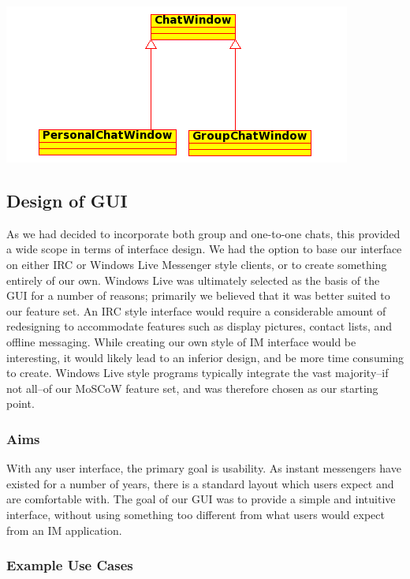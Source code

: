 \includegraphics[scale=0.65]{Design/diagrams/chatwin.png}


\subsection{Design of GUI}
\label{gui_design}

As we had decided to incorporate both group and one-to-one chats, this provided a wide scope in terms of interface design. We had the option to base our interface on either IRC or Windows Live Messenger style clients, or to create something entirely of our own. Windows Live was ultimately selected as the basis of the GUI for a number of reasons; primarily we believed that it was better suited to our feature set. An IRC style interface would require a considerable amount of redesigning to accommodate features such as display pictures, contact lists, and offline messaging. While creating our own style of IM interface would be interesting, it would likely lead to an inferior design, and be more time consuming to create. Windows Live style programs typically integrate the vast majority--if not all--of our MoSCoW feature set, and was therefore chosen as our starting point.

\subsubsection{Aims}

With any user interface, the primary goal is usability. As instant messengers have existed for a number of years, there is a standard layout which users expect and are comfortable with. The goal of our GUI was to provide a simple and intuitive interface, without using something too different from what users would expect from an IM application.
 
\subsubsection{Example Use Cases}

